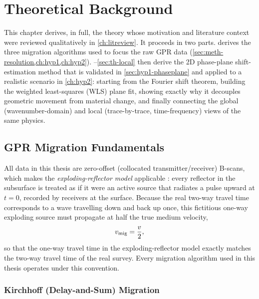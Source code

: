 \chapter{Theoretical Background}
\label{ch:theory}

This chapter derives, in full, the theory whose motivation and literature
context were reviewed qualitatively in \cref{ch:litreview}. It proceeds in
two parts.  derives the three migration algorithms
used to focus the raw GPR data
(\cref{sec:meth-resolution,ch:hyp1,ch:hyp2}).
--\ref{sec:th-local} then derive the 2D phase-plane
shift-estimation method that is validated in \cref{sec:hyp1-phaseplane} and applied
to a realistic scenario in \cref{ch:hyp2}: starting from the Fourier shift
theorem, building the weighted least-squares (WLS) plane fit, showing exactly
why it decouples geometric movement from material change, and finally
connecting the global (wavenumber-domain) and local (trace-by-trace,
time-frequency) views of the same physics.

\section{GPR Migration Fundamentals}
\label{sec:th-migration}

All data in this thesis are zero-offset (collocated transmitter/receiver)
B-scans, which makes the \emph{exploding-reflector model} applicable
\citep{claerbout1985}: every reflector in the subsurface is treated as if it
were an active source that radiates a pulse upward at $t=0$, recorded by
receivers at the surface. Because the real two-way travel time corresponds to
a wave travelling down and back up once, this fictitious one-way exploding
source must propagate at half the true medium velocity,
\begin{equation}
  v_{\mathrm{mig}} = \frac{v}{2},
  \label{eq:vmig}
\end{equation}
so that the one-way travel time in the exploding-reflector model exactly
matches the two-way travel time of the real survey. Every migration algorithm
used in this thesis operates under this convention.

\subsection{Kirchhoff (Delay-and-Sum) Migration}

